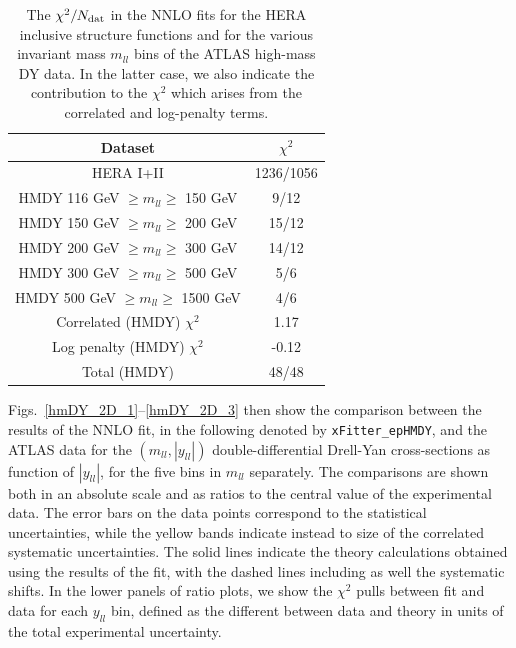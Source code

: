 \begin{table}[t]
  \centering
  \begin{tabular}{|c|c|}
    \hline
    Dataset  &   $\chi^2$ \\
    \hline
    \hline
    HERA I+II & 1236/1056\\
    \hline
    HMDY  116 GeV $\ge m_{ll} \ge $ 150 GeV  &  9/12 \\
    HMDY  150 GeV $\ge m_{ll} \ge $ 200 GeV  &  15/12 \\
    HMDY  200 GeV $\ge m_{ll} \ge $ 300 GeV  &  14/12 \\
    HMDY  300 GeV $\ge m_{ll} \ge $ 500 GeV  &  5/6 \\
    HMDY  500 GeV $\ge m_{ll} \ge $ 1500 GeV &  4/6 \\
    \hline
    Correlated (HMDY) $\chi^2$ & 1.17 \\
    Log penalty (HMDY) $\chi^2$  & -0.12 \\
    \hline
    \hline
    Total  (HMDY) & 48/48 \\
    \hline
    \end{tabular}
  \caption{The $\chi^{2}/N_{\rm dat}$ in the NNLO fits for the
    HERA inclusive structure functions and for the various
    invariant mass $m_{ll}$ bins of the ATLAS high-mass DY data.
    In the latter case, we also indicate the contribution to the
    $\chi^2$ which arises from the correlated and log-penalty terms.
\label{tab:chi2fit}
  }
\end{table}

Figs.~\ref{hmDY_2D_1}--\ref{hmDY_2D_3} then show the
comparison between the results of the NNLO fit, in the following
denoted by {\tt xFitter\_epHMDY},
and the ATLAS data
  for the $(m_{ll},|y_{ll}|)$ double-differential Drell-Yan cross-sections
  as function of $|y_{ll}|$, for the five bins in $m_{ll}$ separately.
  The comparisons are shown both
  in an absolute scale  and as ratios to the central value
  of the experimental data.
  The error bars on the data points correspond to the statistical
  uncertainties, while the yellow bands
  indicate instead to size of the correlated systematic uncertainties.
  The solid lines indicate the theory calculations obtained using the results
  of the fit, with the dashed lines including as well the systematic shifts.
  In the lower panels of ratio plots,
  we show the $\chi^2$ pulls between fit and data for each $y_{ll}$ bin,
  defined as the different between data and theory in units
  of the total experimental uncertainty.


